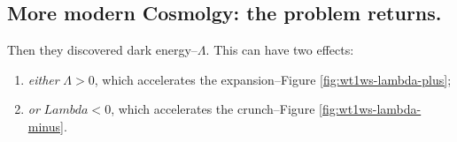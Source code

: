 \documentclass[]{article}
\begin{document}
\begin{figure}[H]
\begin{subfigure}[t]{0.45\textwidth}
	\end{subfigure}
\end{figure}

\subsection{More modern Cosmolgy: the problem returns.}
Then they discovered dark energy--$\Lambda$. This can have two effects:
\begin{enumerate}
	\item \emph{either} $\Lambda>0$, which accelerates the expansion--Figure \ref{fig:wt1ws-lambda-plus};
	\item \emph{or} $Lambda<0$, which accelerates the crunch--Figure \ref{fig:wt1ws-lambda-minus}.
\end{enumerate}
\end{document}

